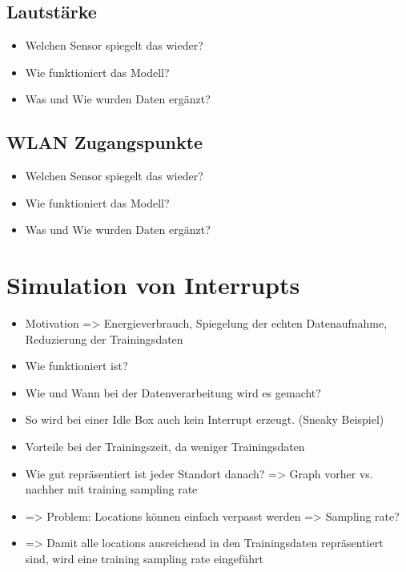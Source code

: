 \subsection{Lautstärke}
\begin{itemize}
    \item Welchen Sensor spiegelt das wieder?
    \item Wie funktioniert das Modell?
    \item Was und Wie wurden Daten ergänzt?
\end{itemize}

\subsection{WLAN Zugangspunkte}
\begin{itemize}
    \item Welchen Sensor spiegelt das wieder?
    \item Wie funktioniert das Modell?
    \item Was und Wie wurden Daten ergänzt?
\end{itemize}

\section{Simulation von Interrupts}
\begin{itemize}
    \item Motivation => Energieverbrauch, Spiegelung der echten Datenaufnahme, Reduzierung der Trainingsdaten
    \item Wie funktioniert ist?
    \item Wie und Wann bei der Datenverarbeitung wird es gemacht?
    \item So wird bei einer Idle Box auch kein Interrupt erzeugt. (Sneaky Beispiel)
    \item Vorteile bei der Trainingszeit, da weniger Trainingsdaten
    \item Wie gut repräsentiert ist jeder Standort danach? => Graph vorher vs. nachher mit training sampling rate
    \item => Problem: Locations können einfach verpasst werden => Sampling rate?
    \item => Damit alle locations ausreichend in den Trainingsdaten repräsentiert sind, wird eine training sampling rate eingeführt
\end{itemize}

